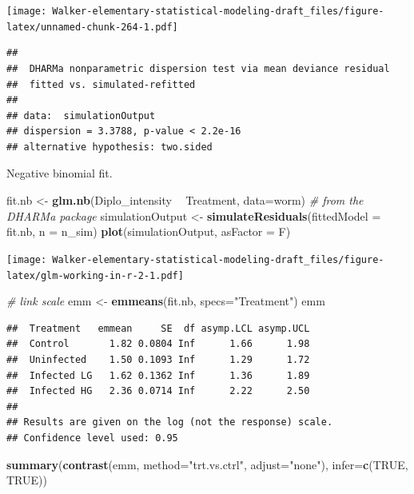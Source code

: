 \documentclass[]{book}
\newenvironment{Shaded}{\begin{snugshade}}{\end{snugshade}}
\newcommand{\CommentTok}[1]{\textcolor[rgb]{0.56,0.35,0.01}{\textit{#1}}}
\newcommand{\DataTypeTok}[1]{\textcolor[rgb]{0.13,0.29,0.53}{#1}}
\newcommand{\KeywordTok}[1]{\textcolor[rgb]{0.13,0.29,0.53}{\textbf{#1}}}
\newcommand{\NormalTok}[1]{#1}
\newcommand{\OperatorTok}[1]{\textcolor[rgb]{0.81,0.36,0.00}{\textbf{#1}}}
\newcommand{\OtherTok}[1]{\textcolor[rgb]{0.56,0.35,0.01}{#1}}
\newcommand{\StringTok}[1]{\textcolor[rgb]{0.31,0.60,0.02}{#1}}
\begin{document}
\texttt{[image: Walker-elementary-statistical-modeling-draft\_files/figure-latex/unnamed-chunk-264-1.pdf]}

\begin{verbatim}
## 
##  DHARMa nonparametric dispersion test via mean deviance residual
##  fitted vs. simulated-refitted
## 
## data:  simulationOutput
## dispersion = 3.3788, p-value < 2.2e-16
## alternative hypothesis: two.sided
\end{verbatim}

Negative binomial fit.

\begin{Shaded}
\begin{Highlighting}[]
\NormalTok{fit.nb <-}\StringTok{ }\KeywordTok{glm.nb}\NormalTok{(Diplo_intensity }\OperatorTok{~}\StringTok{ }\NormalTok{Treatment, }\DataTypeTok{data=}\NormalTok{worm)}
\CommentTok{# from the DHARMa package}
\NormalTok{  simulationOutput <-}\StringTok{ }\KeywordTok{simulateResiduals}\NormalTok{(}\DataTypeTok{fittedModel =}\NormalTok{ fit.nb, }\DataTypeTok{n =}\NormalTok{ n_sim)}
  \KeywordTok{plot}\NormalTok{(simulationOutput, }\DataTypeTok{asFactor =}\NormalTok{ F)}
\end{Highlighting}
\end{Shaded}

\texttt{[image: Walker-elementary-statistical-modeling-draft\_files/figure-latex/glm-working-in-r-2-1.pdf]}

\begin{Shaded}
\begin{Highlighting}[]
\CommentTok{# link scale}
\NormalTok{emm <-}\StringTok{ }\KeywordTok{emmeans}\NormalTok{(fit.nb, }\DataTypeTok{specs=}\StringTok{"Treatment"}\NormalTok{)}
\NormalTok{emm}
\end{Highlighting}
\end{Shaded}

\begin{verbatim}
##  Treatment   emmean     SE  df asymp.LCL asymp.UCL
##  Control       1.82 0.0804 Inf      1.66      1.98
##  Uninfected    1.50 0.1093 Inf      1.29      1.72
##  Infected LG   1.62 0.1362 Inf      1.36      1.89
##  Infected HG   2.36 0.0714 Inf      2.22      2.50
## 
## Results are given on the log (not the response) scale. 
## Confidence level used: 0.95
\end{verbatim}

\begin{Shaded}
\begin{Highlighting}[]
\KeywordTok{summary}\NormalTok{(}\KeywordTok{contrast}\NormalTok{(emm, }\DataTypeTok{method=}\StringTok{"trt.vs.ctrl"}\NormalTok{, }\DataTypeTok{adjust=}\StringTok{"none"}\NormalTok{), }\DataTypeTok{infer=}\KeywordTok{c}\NormalTok{(}\OtherTok{TRUE}\NormalTok{, }\OtherTok{TRUE}\NormalTok{))}
\end{Highlighting}
\end{Shaded}
\end{document}
